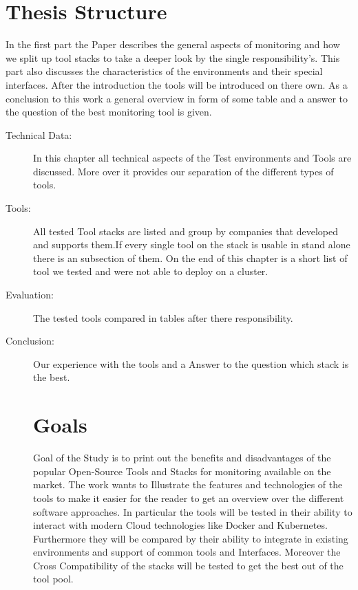 \section*{Thesis Structure}
In the first part the Paper describes the general aspects of monitoring and how we split up tool stacks to take a deeper look by the single responsibility's. This part also discusses the characteristics of the environments and their special interfaces. After the introduction the tools will be introduced on there own. As a conclusion to this work a general overview in form of some table and a answer to the question of the best monitoring tool is given. 
\begin{description}
\item[Technical Data:] In this chapter all technical aspects of the Test environments and Tools are discussed. More over it provides our separation of the different types of tools. 
\item[Tools:] All tested Tool stacks are listed and group by companies that developed and supports them.If every single tool on the stack is usable in stand alone there is an subsection of them. On the end of this chapter is a short list of tool we tested and were not able to deploy on a cluster.
\item[Evaluation:]The tested tools compared in tables after there responsibility.
\item[Conclusion:] Our experience with the tools and a Answer to the question which stack is the best.
\section*{Goals}
Goal of the Study is to print out the benefits and disadvantages of the popular Open-Source Tools and Stacks  for monitoring available on the market. The work wants to Illustrate the features and technologies of the tools to make it easier for the reader to get an overview over the different software approaches. In particular the tools will be tested in their ability to interact with modern Cloud technologies like Docker and Kubernetes. Furthermore they will be compared by their ability to integrate in existing environments and support of common tools and Interfaces. Moreover the Cross Compatibility of the stacks will be tested to get the best out of the tool pool.
\end{description}
